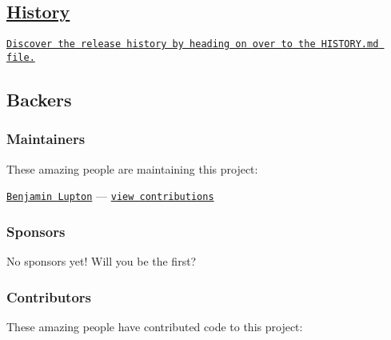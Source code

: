 \subsection*{\mbox{\hyperlink{interface_history}{History}}}

\href{https://github.com/bevry/domain-browser/blob/master/HISTORY.md#files}{\tt Discover the release history by heading on over to the {\ttfamily H\+I\+S\+T\+O\+R\+Y.\+md} file.}

\subsection*{Backers}

\subsubsection*{Maintainers}

These amazing people are maintaining this project\+:


\begin{DoxyItemize}
\item \href{http://balupton.com}{\tt Benjamin Lupton} — \href{https://github.com/bevry/domain-browser/commits?author=balupton}{\tt view contributions}
\end{DoxyItemize}

\subsubsection*{Sponsors}

No sponsors yet! Will you be the first?

\href{http://patreon.com/bevry}{\tt } \href{https://www.gratipay.com/bevry}{\tt } \href{http://flattr.com/thing/344188/balupton-on-Flattr}{\tt } \href{https://www.paypal.com/cgi-bin/webscr?cmd=_s-xclick&amp;hosted_button_id=QB8GQPZAH84N6}{\tt } \href{https://bevry.me/bitcoin}{\tt } \href{https://bevry.me/wishlist}{\tt }

\subsubsection*{Contributors}

These amazing people have contributed code to this project\+:


